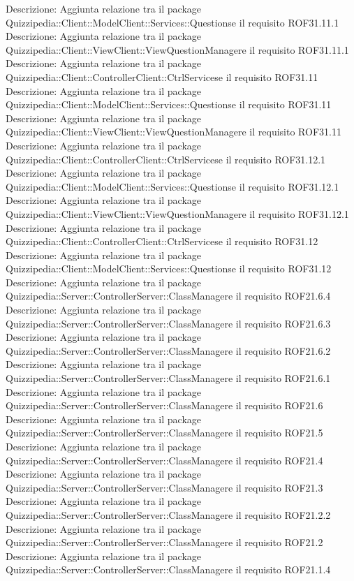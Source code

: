 Descrizione: Aggiunta relazione tra il package Quizzipedia::Client::ModelClient::Services::Questionse il requisito ROF31.11.1 
Descrizione: Aggiunta relazione tra il package Quizzipedia::Client::ViewClient::ViewQuestionManagere il requisito ROF31.11.1 
Descrizione: Aggiunta relazione tra il package Quizzipedia::Client::ControllerClient::CtrlServicese il requisito ROF31.11 
Descrizione: Aggiunta relazione tra il package Quizzipedia::Client::ModelClient::Services::Questionse il requisito ROF31.11 
Descrizione: Aggiunta relazione tra il package Quizzipedia::Client::ViewClient::ViewQuestionManagere il requisito ROF31.11 
Descrizione: Aggiunta relazione tra il package Quizzipedia::Client::ControllerClient::CtrlServicese il requisito ROF31.12.1 
Descrizione: Aggiunta relazione tra il package Quizzipedia::Client::ModelClient::Services::Questionse il requisito ROF31.12.1 
Descrizione: Aggiunta relazione tra il package Quizzipedia::Client::ViewClient::ViewQuestionManagere il requisito ROF31.12.1 
Descrizione: Aggiunta relazione tra il package Quizzipedia::Client::ControllerClient::CtrlServicese il requisito ROF31.12 
Descrizione: Aggiunta relazione tra il package Quizzipedia::Client::ModelClient::Services::Questionse il requisito ROF31.12 
Descrizione: Aggiunta relazione tra il package Quizzipedia::Server::ControllerServer::ClassManagere il requisito ROF21.6.4 
Descrizione: Aggiunta relazione tra il package Quizzipedia::Server::ControllerServer::ClassManagere il requisito ROF21.6.3 
Descrizione: Aggiunta relazione tra il package Quizzipedia::Server::ControllerServer::ClassManagere il requisito ROF21.6.2 
Descrizione: Aggiunta relazione tra il package Quizzipedia::Server::ControllerServer::ClassManagere il requisito ROF21.6.1 
Descrizione: Aggiunta relazione tra il package Quizzipedia::Server::ControllerServer::ClassManagere il requisito ROF21.6 
Descrizione: Aggiunta relazione tra il package Quizzipedia::Server::ControllerServer::ClassManagere il requisito ROF21.5 
Descrizione: Aggiunta relazione tra il package Quizzipedia::Server::ControllerServer::ClassManagere il requisito ROF21.4 
Descrizione: Aggiunta relazione tra il package Quizzipedia::Server::ControllerServer::ClassManagere il requisito ROF21.3 
Descrizione: Aggiunta relazione tra il package Quizzipedia::Server::ControllerServer::ClassManagere il requisito ROF21.2.2 
Descrizione: Aggiunta relazione tra il package Quizzipedia::Server::ControllerServer::ClassManagere il requisito ROF21.2 
Descrizione: Aggiunta relazione tra il package Quizzipedia::Server::ControllerServer::ClassManagere il requisito ROF21.1.4 
